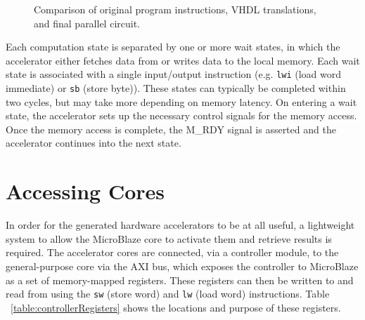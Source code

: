 \documentclass{UoYCSproject}
\begin{document}
\begin{figure}[H]
\caption{Comparison of original program instructions, VHDL translations, and final parallel circuit.}
\label{fig:computationState}
\end{figure}

Each computation state is separated by one or more wait states, in which the accelerator either fetches data from or writes data
to the local memory. Each wait state is associated with a single input/output instruction
(e.g. \texttt{lwi} (load word immediate) or \texttt{sb} (store byte)). These states can typically be completed within two
cycles, but may take more depending on memory latency. On entering a wait state, the accelerator sets up the necessary control
signals for the memory access. Once the memory access is complete, the M\_RDY signal is asserted and the accelerator continues
into the next state.

\section{Accessing Cores}

In order for the generated hardware accelerators to be at all useful, a lightweight system to allow the MicroBlaze core to
activate them and retrieve results is required. The accelerator cores are connected, via a controller module, to the
general-purpose core via the AXI bus, which exposes the controller to MicroBlaze as a set of memory-mapped registers.
These registers can then be written to and read from using the \texttt{sw} (store word) and \texttt{lw} (load word) instructions.
Table ~\ref{table:controllerRegisters} shows the locations and purpose of these registers.
\end{document}

